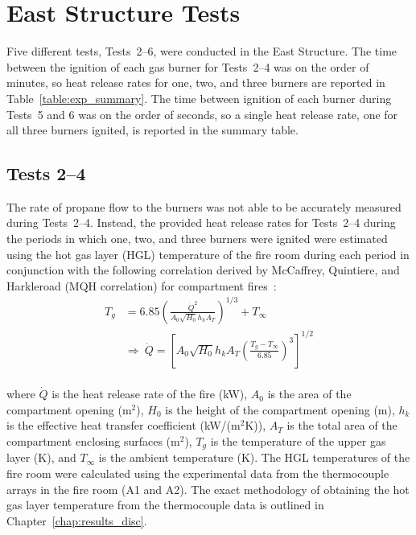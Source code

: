 \section{East Structure Tests}
Five different tests, Tests~2--6, were conducted in the East Structure. The time between the ignition of each gas burner for Tests~2--4 was on the order of minutes, so heat release rates for one, two, and three burners are reported in Table~\ref{table:exp_summary}. The time between ignition of each burner during Tests~5 and 6 was on the order of seconds, so a single heat release rate, one for all three burners ignited, is reported in the summary table.

\subsection{Tests 2--4}
The rate of propane flow to the burners was not able to be accurately measured during Tests~2--4. Instead, the provided heat release rates for Tests~2--4 during the periods in which one, two, and three burners were ignited were estimated using the hot gas layer (HGL) temperature of the fire room during each period in conjunction with the following correlation derived by McCaffrey, Quintiere, and Harkleroad (MQH correlation) for compartment fires~\cite{McCaffery:1}: 
\\
\begin{equation}
\label{eq:MQH}
\begin{split}
  T_g &= 6.85 \left( \frac{\dot{Q}^2}{A_0 \sqrt{H_0} h_k A_T}\right)^{1/3}+T_{\infty} \\
  &\Rightarrow~\dot{Q} = \left[A_0  \sqrt{H_0} h_k A_T \left( \frac{T_g-T_{\infty}}{6.85}\right)^3\right]^{1/2}
\end{split}
\end{equation}
\\
where $\dot{Q}$ is the heat release rate of the fire (kW), $A_0$ is the area of the compartment opening (m$^2$), $H_0$ is the height of the compartment opening (m), $h_k$ is the effective heat transfer coefficient (kW/(m$^2$K)), $A_T$ is the total area of the compartment enclosing surfaces (m$^2$), $T_g$ is the temperature of the upper gas layer (K), and $T_{\infty}$ is the ambient temperature (K). The HGL temperatures of the fire room were calculated using the experimental data from the thermocouple arrays in the fire room (A1 and A2). The exact methodology of obtaining the hot gas layer temperature from the thermocouple data is outlined in Chapter~\ref{chap:results_disc}.

